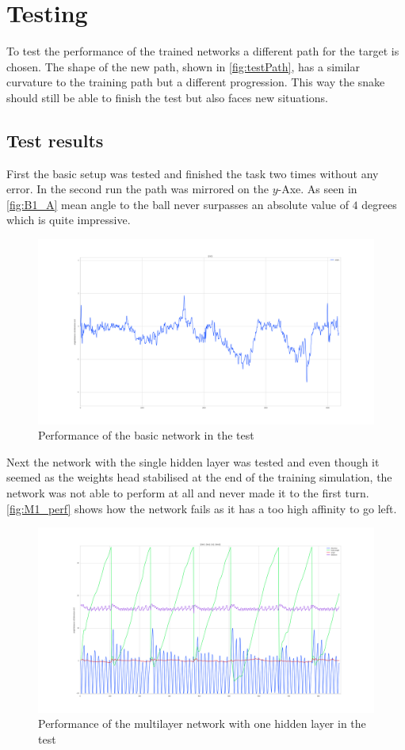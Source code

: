 \chapter{Testing}
To test the performance of the trained networks a different path for the target is chosen. The shape of the new path, shown in \autoref{fig:testPath}, has a similar curvature to the training path but a different progression. This way the snake should still be able to finish the test but also faces new situations. 

\section{Test results}
First the basic setup was tested and finished the task two times without any error. In the second run the path was mirrored on the $y$-Axe. As seen in \autoref{fig:B1_A} mean angle to the ball never surpasses an absolute value of $4$ degrees which is quite impressive.
\newline
\begin{figure}[htpb]
  \centering
  \includegraphics[width=\textwidth]{figures/plots/B1_A}
  \caption{ Performance of the basic network in the test }
  \label{fig:B1_A}
\end{figure}
Next the network with the single hidden layer was tested and even though it seemed as the weights head stabilised at the end of the training simulation, the network was not able to perform at all and never made it to the first turn. \autoref{fig:M1_perf} shows how the network fails as it has a too high affinity to go left.
\begin{figure}[htpb]
  \centering
  \includegraphics[width=\textwidth]{figures/plots/M1_perf}
  \caption{ Performance of the multilayer network with one hidden layer in the test }
  \label{fig:M1_perf}
\end{figure}
